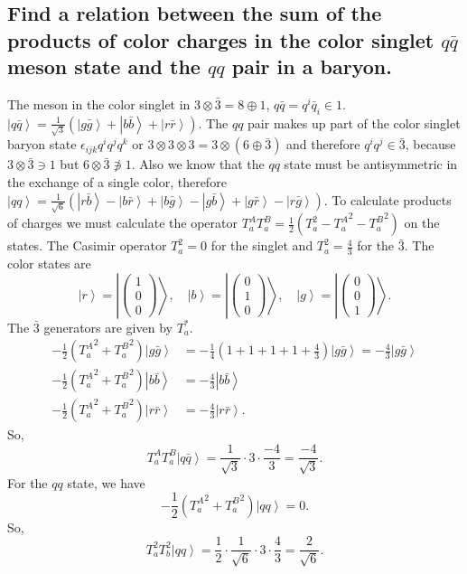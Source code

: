 \documentclass[main.tex]{subfiles}
\begin{document}
\subsection{Find a relation between the sum of the products of color charges in the color singlet $q\bar{q}$ meson state and the $qq$ pair in a baryon.}
The meson in the color singlet in $3\otimes\bar{3}=8\oplus1$, $q\bar{q}=q^i\bar{q}_i\in1$. $\left|q\bar{q}\right>=\frac{1}{\sqrt{3}}(\left|g\bar{g}\right>+\left|b\bar{b}\right>+\left|r\bar{r}\right>)$. The $qq$ pair makes up part of the color singlet baryon state $\epsilon_{ijk}q^iq^jq^k$ or $3\otimes3\otimes3=3\otimes(6\oplus\bar{3})$ and therefore $q^iq^j\in\bar{3}$, because $3\otimes\bar{3}\ni1$ but $6\otimes\bar{3}\not\ni1$. Also we know that the $qq$ state must be antisymmetric in the exchange of a single color, therefore $\left|qq\right>=\frac{1}{\sqrt{6}}(\left|r\bar{b}\right>-\left|b\bar{r}\right>+\left|b\bar{g}\right>-\left|g\bar{b}\right>+\left|g\bar{r}\right>-\left|r\bar{g}\right>)$. To calculate products of charges we must calculate the operator $T_a^AT_a^B=\frac{1}{2}(T_a^2-{T_a^A}^2-{T_a^B}^2)$ on the states. The Casimir operator $T_a^2=0$ for the singlet and $T_a^2=\frac{4}{3}$ for the $\bar{3}$.
The color states are
\begin{equation}
\left|r\right>=\left|\begin{pmatrix}1\\0\\0\end{pmatrix}\right>,\quad\left|b\right>=\left|\begin{pmatrix}0\\1\\0\end{pmatrix}\right>,\quad\left|g\right>=\left|\begin{pmatrix}0\\0\\1\end{pmatrix}\right>.
\end{equation}
The $\bar{3}$ generators are given by $T_a^*$.
\begin{align}
-\frac{1}{2}({T_a^A}^2+{T_a^B}^2)\left|g\bar{g}\right>&=-\frac{1}{4}(1+1+1+1+\frac{4}{3})\left|g\bar{g}\right>=-\frac{4}{3}\left|g\bar{g}\right>\\
-\frac{1}{2}({T_a^A}^2+{T_a^B}^2)\left|b\bar{b}\right>&=-\frac{4}{3}\left|b\bar{b}\right>\\
-\frac{1}{2}({T_a^A}^2+{T_a^B}^2)\left|r\bar{r}\right>&=-\frac{4}{3}\left|r\bar{r}\right>.
\end{align}
So,
\begin{equation}
T_a^AT_a^B\left|q\bar{q}\right>=\frac{1}{\sqrt{3}}\cdot3\cdot\frac{-4}{3}=\frac{-4}{\sqrt{3}}.
\end{equation}
For the $qq$ state, we have
\begin{equation}
-\frac{1}{2}({T_a^A}^2+{T_a^B}^2)\left|qq\right>=0.
\end{equation}
So,
\begin{equation}
T_a^2T_b^2\left|qq\right>=\frac{1}{2}\cdot\frac{1}{\sqrt{6}}\cdot3\cdot\frac{4}{3}=\frac{2}{\sqrt{6}}.
\end{equation}
\end{document}
